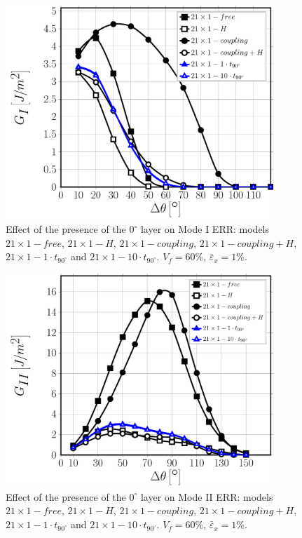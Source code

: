 \begin{figure}[!htb]
\centering
\includegraphics[width=0.9\textwidth]{paperC/nx1-1-vf60-GI.pdf}
\caption{Effect of the presence of the $0^{\circ}$ layer on Mode I ERR: models $21\times 1-free$, $21\times 1-H$, $21\times 1-coupling$, $21\times 1-coupling+H$, $21\times 1-1\cdot t_{90^{\circ}}$ and $21\times 1-10\cdot t_{90^{\circ}}$. $V_{f}=60\%$, $\bar{\varepsilon}_{x}=1\%$.}\label{chap3:paperC:fig:debonddebondGI}
\end{figure}

\begin{figure}[!htb]
\centering
\includegraphics[width=0.9\textwidth]{paperC/nx1-1-vf60-GII.pdf}
\caption{Effect of the presence of the $0^{\circ}$ layer on Mode II ERR: models $21\times 1-free$, $21\times 1-H$, $21\times 1-coupling$, $21\times 1-coupling+H$, $21\times 1-1\cdot t_{90^{\circ}}$ and $21\times 1-10\cdot t_{90^{\circ}}$. $V_{f}=60\%$, $\bar{\varepsilon}_{x}=1\%$.}\label{chap3:paperC:fig:debonddebondGII}
\end{figure}

